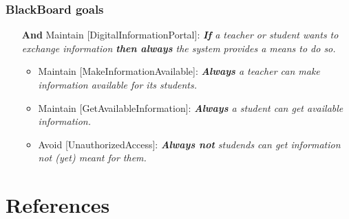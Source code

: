 \subsection*{BlackBoard goals}

\begin{itemize}
	\item[\textbf{And}] Maintain [DigitalInformationPortal]:
	\emph{\textbf{If} a teacher or student wants to exchange information \textbf{then always} the system provides a means to do so.}
	
	\begin{itemize}
		\item Maintain [MakeInformationAvailable]:		
		\emph{\textbf{Always} a teacher can make information available for its students.}
		
		\item Maintain [GetAvailableInformation]:
		\emph{\textbf{Always} a student can get available information.}
		
		\item Avoid [UnauthorizedAccess]:
		\emph{\textbf{Always not} studends can get information not (yet) meant for them.}
	\end{itemize}
\end{itemize}


\chapter{References}

\begin{thebibliography}{9}
	
\end{thebibliography}


\appendix



